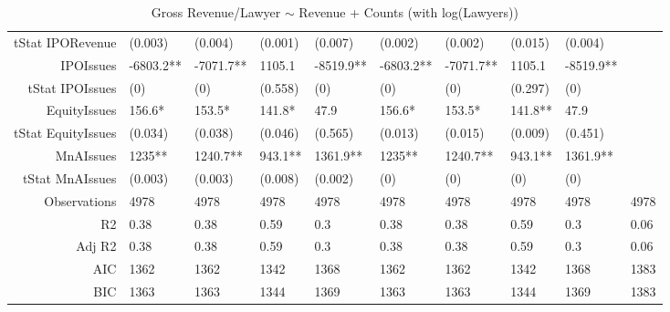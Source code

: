 \begin{table}[ht]
\begin{tabular}{rlllllllll}
  tStat IPORevenue & (0.003) & (0.004) & (0.001) & (0.007) & (0.002) & (0.002) & (0.015) & (0.004) &  \\ 
  IPOIssues & -6803.2** & -7071.7** & 1105.1 & -8519.9** & -6803.2** & -7071.7** & 1105.1 & -8519.9** &  \\ 
  tStat IPOIssues & (0) & (0) & (0.558) & (0) & (0) & (0) & (0.297) & (0) &  \\ 
  EquityIssues & 156.6* & 153.5* & 141.8* & 47.9 & 156.6* & 153.5* & 141.8** & 47.9 &  \\ 
  tStat EquityIssues & (0.034) & (0.038) & (0.046) & (0.565) & (0.013) & (0.015) & (0.009) & (0.451) &  \\ 
  MnAIssues & 1235** & 1240.7** & 943.1** & 1361.9** & 1235** & 1240.7** & 943.1** & 1361.9** &  \\ 
  tStat MnAIssues & (0.003) & (0.003) & (0.008) & (0.002) & (0) & (0) & (0) & (0) &  \\ 
  Observations & 4978 & 4978 & 4978 & 4978 & 4978 & 4978 & 4978 & 4978 & 4978 \\ 
  R2 & 0.38 & 0.38 & 0.59 & 0.3 & 0.38 & 0.38 & 0.59 & 0.3 & 0.06 \\ 
  Adj R2 & 0.38 & 0.38 & 0.59 & 0.3 & 0.38 & 0.38 & 0.59 & 0.3 & 0.06 \\ 
  AIC & 1362 & 1362 & 1342 & 1368 & 1362 & 1362 & 1342 & 1368 & 1383 \\ 
  BIC & 1363 & 1363 & 1344 & 1369 & 1363 & 1363 & 1344 & 1369 & 1383 \\ 
   \hline
\end{tabular}
\caption{Gross Revenue/Lawyer $\sim$ Revenue + Counts (with log(Lawyers))} 
\end{table}
